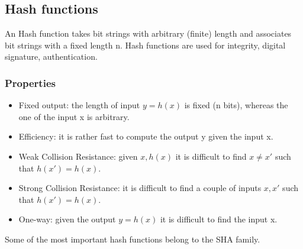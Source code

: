 \documentclass[a4paper, 10pt, titlepage]{article}
\begin{document}
\subsection{Hash functions}
An Hash function takes bit strings with arbitrary (finite) length and associates bit strings with a fixed length n. Hash functions are used for integrity, digital signature, authentication.

\subsubsection{Properties}
\begin{itemize}
\item Fixed output: the length of input $y = h(x)$ is fixed (n bits), whereas the one of the input x is arbitrary.
\item Efficiency: it is rather fast to compute the output y given the
input x.
\item Weak Collision Resistance: given $x, h(x)$ it is difficult to find $x \neq x'$ such that $h(x') = h(x)$.
\item Strong Collision Resistance: it is difficult to find a couple of inputs $x, x'$ such that $h(x') = h(x)$.
\item One-way: given the output $y = h(x)$ it is difficult to find the input x.
\end{itemize}
Some of the most important hash functions belong to the SHA family.
\end{document}
